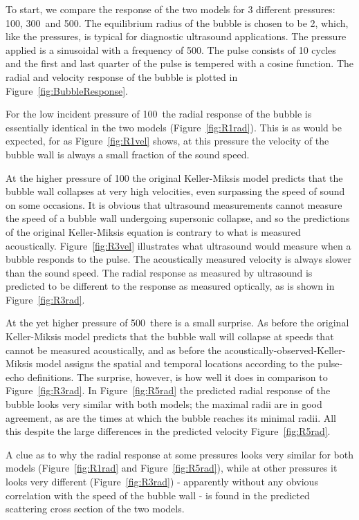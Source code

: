 \documentclass[10pt, fleqn,draft,showtrims,oldfontcommands]{article} %
\newcommand{\figref}[1]{Figure~\ref{fig:#1}}
\newcommand{\Figref}[1]{Figure~\ref{fig:#1}}
\begin{document}
To start, we compare  the response of the two models for 3 different pressures:
\unit{100}\kilo\pascal, \unit{300}\kilo\pascal\ and \unit{500}\kilo\pascal.
The equilibrium radius of the bubble is chosen to be \unit{2}\micro\meter, 
which, like the pressures, is typical for diagnostic ultrasound applications.
The pressure applied is a sinusoidal  with a frequency of \unit{500}\kilo\hertz.
The pulse consists of 10 cycles and the first and last quarter of the pulse is tempered with a cosine function.
The radial and velocity response of the bubble is plotted in \figref{BubbleResponse}.




For the low incident pressure of \unit{100}\kilo\pascal\ the radial response of the bubble is essentially identical in the two models (\figref{R1rad}).
This is as would be expected, for as \figref{R1vel} shows,  at this pressure the velocity of the bubble wall 
is always a small fraction of the sound speed.

At the higher pressure of \unit{100}\kilo\pascal 
the original Keller-Miksis model predicts that the bubble wall collapses at very high velocities,
even surpassing the speed of sound on some occasions.
It is obvious that ultrasound measurements cannot measure the speed of a bubble wall undergoing  supersonic collapse, 
and so the predictions of the original Keller-Miksis equation is contrary to what is measured acoustically.
\Figref{R3vel} illustrates what ultrasound would measure when a bubble responds to the pulse.
The acoustically measured velocity is always slower than the sound speed.
The radial response as measured by ultrasound is predicted to be different to the response as measured optically, 
as is shown in \figref{R3rad}.

At the yet higher pressure of \unit{500}\kilo\pascal\ there is a small surprise.
As before the original Keller-Miksis model predicts that the bubble wall will collapse at speeds that cannot be measured acoustically,
and as before the acoustically-observed-Keller-Miksis model assigns the  spatial and temporal locations according to the pulse-echo definitions.
The surprise, 
however, is how well it does in comparison to \Figref{R3rad}.
In \figref{R5rad} the predicted radial response of the bubble looks very similar with both models;
the maximal radii are in good agreement, as are the  times at which the bubble reaches its minimal radii.
All this despite the large differences in the predicted velocity \figref{R5rad}.

A clue as to why the radial response at some pressures looks very similar for both models (\figref{R1rad} and \figref{R5rad}),
while at other pressures it looks very different (\figref{R3rad}) 
- apparently without any obvious correlation with the speed of the bubble wall -
is found in the predicted scattering cross section of the two models.
\end{document}
